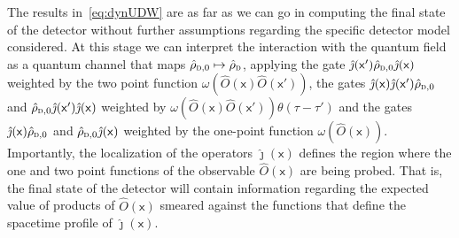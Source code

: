 \documentclass[letterpaper,12pt,titlepage,oneside,final]{book}
\newcommand{\mf}{\mathsf}%
\newcommand{\ii}{\mathrm{i}}
\renewcommand{\r}{\hat{\rho}}
\newcommand{\tc}[1]{\textsc{#1}}
\begin{document}
The results in~\eqref{eq:dynUDW} are as far as we can go in computing the final state of the detector without further assumptions regarding the specific detector model considered. At this stage we can interpret the interaction with the quantum field as a quantum channel that maps $\hat{\rho}_{\tc{d},0}\mapsto \hat{\rho}_\tc{d}$, applying the gate $\hat{\jmath}(\mf x') \r_{\tc{d},0}\hat{\jmath}(\mf x)$ weighted by the two point function $\omega(\hat{O}(\mf x)\hat{O}( \mf x'))$, the gates $\hat{\jmath}(\mf x)\hat{\jmath}(\mf x')\r_{\tc{d},0}$ and $\r_{\tc{d},0}\hat{\jmath}(\mf x')\hat{\jmath}(\mf x)$ weighted by $\omega(\hat{O}(\mf x)\hat{O}( \mf x'))\theta(\tau-\tau')$ and the gates $\hat{\jmath}(\mf x) \r_{\tc{d},0}$ and $\r_{\tc{d},0}\hat{\jmath}(\mf x)$ weighted by the one-point function $\omega(\hat{O}(\mf x))$. Importantly, the localization of the operators $\hat{\jmath}(\mf x)$ defines the region where the one and two point functions of the observable $\hat{O}(\mf x)$ are being probed. That is, the final state of the detector will contain information regarding the expected value of products of $\hat{O}(\mf x)$ smeared against the functions that define the spacetime profile of $\hat{\jmath}(\mf x)$.





\end{document}
